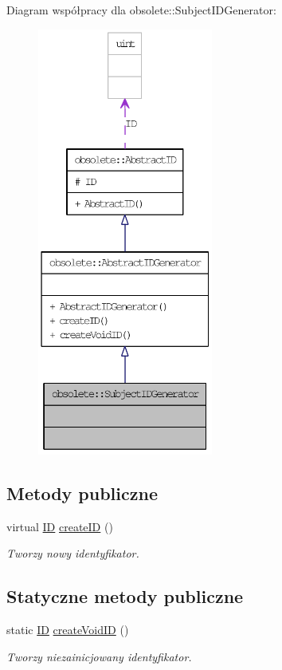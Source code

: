 Diagram współpracy dla obsolete::SubjectIDGenerator:\nopagebreak
\begin{figure}[H]
\begin{center}
\leavevmode
\includegraphics[height=400pt]{classobsolete_1_1SubjectIDGenerator__coll__graph}
\end{center}
\end{figure}
\subsection*{Metody publiczne}
\begin{DoxyCompactItemize}
\item 
virtual \hyperlink{classobsolete_1_1ID}{ID} \hyperlink{classobsolete_1_1AbstractIDGenerator_a39d2f0147e3a028fef8299770e23db90}{createID} ()
\begin{DoxyCompactList}\small\item\em Tworzy nowy identyfikator. \item\end{DoxyCompactList}\end{DoxyCompactItemize}
\subsection*{Statyczne metody publiczne}
\begin{DoxyCompactItemize}
\item 
static \hyperlink{classobsolete_1_1ID}{ID} \hyperlink{classobsolete_1_1AbstractIDGenerator_a330da88ba80820ca6ce0a29cbbab9e1b}{createVoidID} ()
\begin{DoxyCompactList}\small\item\em Tworzy niezainicjowany identyfikator. \item\end{DoxyCompactList}\end{DoxyCompactItemize}
